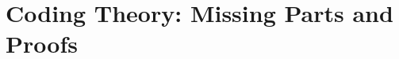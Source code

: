 \appendix


\section{Coding Theory: Missing Parts and Proofs}
\begin{comment}
\subsection{Interleaved Codes: Alternative interpretation} \label{app:AltILC}
For concreteness, let $\FF$ be the finite field $\FF_q$, consisting of $q$
elements. Let $\HH$ denote the finite field consisting of $q^m$ elements. From
standard algebra, the field $\HH$ is specified by an irreducible polynomial $h(x)\in \FF[x]$ of
degree $m$ as follows:
\begin{itemize}
\item The elements of $\HH$ are polynomials $a(x)$ over $\FF$ of degree at most
$m-1$.
\item The field operations $(+,\cdot)$ on $\HH$ are defined as corresponding
polynomial operations modulo $h(x)$, i.e, on $\HH$ we define $a(x)+b(x) =
(a(x)+b(x)) \text{ mod } h(x)$ and $a(x)\cdot b(x) = (a(x)\cdot b(x)) \text{ mod
} h(x)$. 
\end{itemize}
We can identify the elements of field $\HH$ naturally with the set $\FF^m$ via
the bijection $f:\FF^m\leftrightarrow \HH$ given by
$f(a_0,\ldots,a_{m-1})=\sum_{i=0}a_ix^i$. For any $a,b\in \FF^m$ and $\alpha\in
\FF$, it is seen that $f(a+b)=f(a)+f(b)$ and $f(\alpha a)=\alpha f(a)$. We can
extend $f$ to the bijection $\tilde{f}$ between the set $\mc{M}_{m,n}$ of $m\times n$
matrices over $\FF$ and $\HH^n$ by defining:
\begin{equation}\label{lem:bijection}
\tilde{f}(A) = \big(f(A[\cdot,1]),\ldots,f(A[\cdot,n])\big)
\end{equation}
We have the following:
\begin{lemma}[Correspondence Lemma]\label{lem:correspondence}
Let $L$ be an $[n,k,d]$ code over the field $\FF=\FF_q$, and let $\mc{C} :=
\ric{L}{m}$ be the row interleaved code of $L$. Then $\tilde{f}(\mc{C})$ is an
$[n,k,d]$ code over the field $\HH$, where $\HH=\FF_{q^m}\cong \FF^m$. Moreover,
the generator matrix $\mc{G}$ of $L$ is also the generator matrix of
$\tilde{f}(\mc{C})$. We note that in the latter case $\mc{G}$ is viewed as a
matrix over the field $\HH$.
\end{lemma}
\begin{proof}

\end{comment}
